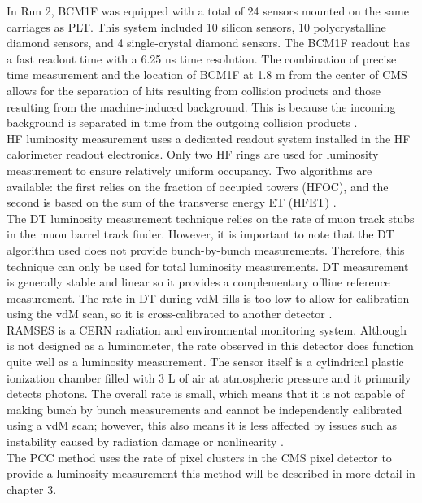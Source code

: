 In Run 2, BCM1F was equipped with a total of 24 sensors mounted on the same carriages as PLT. This system included 10 silicon sensors, 10 polycrystalline diamond sensors, and 4 single-crystal diamond sensors. The BCM1F readout has a fast readout time with a 6.25 ns time resolution. The combination of precise time measurement and the location of BCM1F at 1.8 m from the center of CMS allows for the separation of hits resulting from collision products and those resulting from the machine-induced background. This is because the incoming background is separated in time from the outgoing collision products \cite{pas_18}.\\ 

HF luminosity measurement uses a dedicated readout system installed in the HF calorimeter readout electronics. Only two HF rings are used for luminosity measurement to ensure relatively uniform occupancy. Two algorithms are available: the first relies on the fraction of occupied towers (HFOC), and the second is based on the sum of the transverse energy ET (HFET)  \cite{pas_18}.\\

The DT luminosity measurement technique relies on the rate of muon track stubs in the muon barrel track finder. However, it is important to note that the DT algorithm used does not provide bunch-by-bunch measurements. Therefore, this technique can only be used for total luminosity measurements. DT measurement is generally  stable and linear so it provides a complementary offline reference measurement. The rate in DT during vdM fills is too low to allow for calibration using the vdM scan, so it is cross-calibrated to another detector \cite{pas_18}.\\

RAMSES  is a CERN radiation and environmental monitoring system. Although is not designed as a luminometer, the rate observed in this detector does function quite well as a luminosity measurement. The sensor itself is a cylindrical plastic ionization chamber filled with 3 L of air at atmospheric pressure and it primarily detects photons.  The overall rate is small, which means that it is not capable of making bunch by bunch measurements and cannot be independently calibrated using a vdM scan; however, this also means it is less affected by issues such as instability caused by radiation damage or nonlinearity \cite{pas_18}.\\

The PCC method uses the rate of pixel clusters in the CMS pixel detector to provide a luminosity measurement this method will be described in more detail in chapter 3.  

